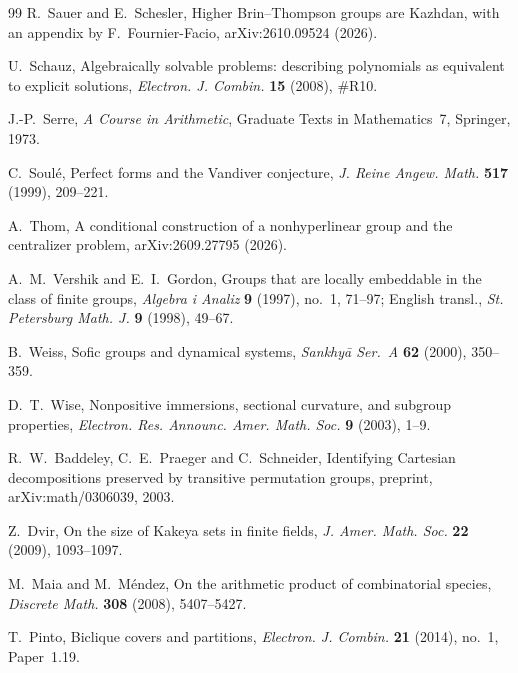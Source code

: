 \documentclass[11pt]{article}
\theoremstyle{definition}
\theoremstyle{remark}
\numberwithin{equation}{section}
\begin{document}
\begin{thebibliography}{99}
R.~Sauer and E.~Schesler,
Higher Brin--Thompson groups are Kazhdan, with an appendix by F.~Fournier-Facio,
arXiv:2610.09524 (2026).

U.~Schauz,
Algebraically solvable problems: describing polynomials as equivalent to explicit solutions,
\emph{Electron. J. Combin.} \textbf{15} (2008), \#R10.

J.-P.~Serre,
\emph{A Course in Arithmetic},
Graduate Texts in Mathematics~7, Springer, 1973.

C.~Soul\'e,
Perfect forms and the Vandiver conjecture,
\emph{J. Reine Angew. Math.} \textbf{517} (1999), 209--221.

A.~Thom,
A conditional construction of a nonhyperlinear group and the centralizer problem,
arXiv:2609.27795 (2026).

A.~M.~Vershik and E.~I.~Gordon,
Groups that are locally embeddable in the class of finite groups,
\emph{Algebra i Analiz} \textbf{9} (1997), no.~1, 71--97; English transl., \emph{St. Petersburg Math. J.} \textbf{9} (1998), 49--67.

B.~Weiss,
Sofic groups and dynamical systems,
\emph{Sankhy\=a Ser.~A} \textbf{62} (2000), 350--359.

D.~T.~Wise,
Nonpositive immersions, sectional curvature, and subgroup properties,
\emph{Electron. Res. Announc. Amer. Math. Soc.} \textbf{9} (2003), 1--9.

R.~W.~Baddeley, C.~E.~Praeger and C.~Schneider,
Identifying Cartesian decompositions preserved by transitive permutation groups,
preprint, arXiv:math/0306039, 2003.

Z.~Dvir,
On the size of Kakeya sets in finite fields,
\emph{J. Amer. Math. Soc.} \textbf{22} (2009), 1093--1097.

M.~Maia and M.~M\'endez,
On the arithmetic product of combinatorial species,
\emph{Discrete Math.} \textbf{308} (2008), 5407--5427.

T.~Pinto,
Biclique covers and partitions,
\emph{Electron. J. Combin.} \textbf{21} (2014), no.~1, Paper~1.19.

\end{thebibliography}
\end{document}
